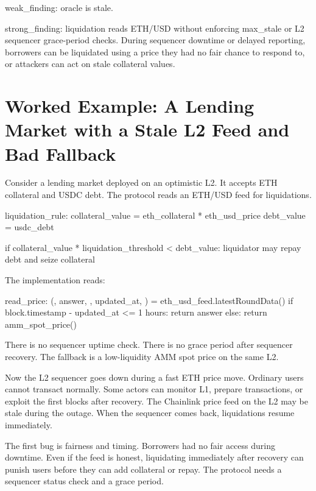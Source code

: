 \begin{codeblock}
weak_finding:
    oracle is stale.

strong_finding:
    liquidation reads ETH/USD without enforcing max_stale or L2 sequencer
    grace-period checks. During sequencer downtime or delayed reporting,
    borrowers can be liquidated using a price they had no fair chance to
    respond to, or attackers can act on stale collateral values.
\end{codeblock}

\section{Worked Example: A Lending Market with a Stale L2 Feed and Bad Fallback}

Consider a lending market deployed on an optimistic L2. It accepts ETH collateral and USDC debt. The protocol reads an ETH/USD feed for liquidations.

\begin{codeblock}
liquidation_rule:
    collateral_value = eth_collateral * eth_usd_price
    debt_value = usdc_debt

    if collateral_value * liquidation_threshold < debt_value:
        liquidator may repay debt and seize collateral
\end{codeblock}

The implementation reads:

\begin{codeblock}
read_price:
    (, answer, , updated_at, ) = eth_usd_feed.latestRoundData()
    if block.timestamp - updated_at <= 1 hours:
        return answer
    else:
        return amm_spot_price()
\end{codeblock}

There is no sequencer uptime check. There is no grace period after sequencer recovery. The fallback is a low-liquidity AMM spot price on the same L2.

Now the L2 sequencer goes down during a fast ETH price move. Ordinary users cannot transact normally. Some actors can monitor L1, prepare transactions, or exploit the first blocks after recovery. The Chainlink price feed on the L2 may be stale during the outage. When the sequencer comes back, liquidations resume immediately.

The first bug is fairness and timing. Borrowers had no fair access during downtime. Even if the feed is honest, liquidating immediately after recovery can punish users before they can add collateral or repay. The protocol needs a sequencer status check and a grace period.

